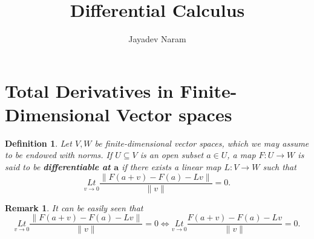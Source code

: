 \documentclass[11pt,a4paper]{article}
\author{Jayadev Naram}
\title{Differential Calculus}
\begin{document}
\date{}
\maketitle
\tableofcontents

\newtheorem{theorem}{Theorem}
\newtheorem*{corollary}{Corollary}
\newtheorem{lemma}[theorem]{Lemma}
\newtheorem{definition}{Definition}
\newtheorem{remark}{Remark}
\newtheorem{example}{Example}
\newtheorem{proposition}{Proposition}

\newcommand{\R}{\mathbb{R}}
\newcommand{\A}{\mathcal{A}}
\newcommand{\M}{\mathcal{M}}
\newcommand{\N}{\mathcal{N}}
\newcommand{\T}{\mathcal{T}}
\newcommand{\B}{\mathcal{B}}
\newcommand{\bb}{\mathbb{B}}
\newcommand{\highlight}[1]{\textsl{\textbf{#1}}}
\newcommand{\mapping}[3]{#1:#2\rightarrow #3}
\newcommand{\doubt}{\highlight{[??]}}
\newcommand{\bigvert}[2]{\left.#1\right|_{#2}}
\newcommand{\sdnn}[1]{${#1}$}
\newcommand{\bsdnn}[1]{$\boldsymbol{#1}$}
\newcommand{\ifthen}[2]{\textbf{(#1)}\boldsymbol{\implies}\textbf{(#2)}}
\newcommand{\bsdn}[1]{\boldsymbol{#1}}
\newcommand{\forward}{$(\implies)$}
\newcommand{\converse}{$(\impliedby)$}
\newcommand{\Lt}[1]{\underset{#1\rightarrow 0}{Lt}}
\newcommand{\norm}[1]{\|#1\|}
\newcommand{\dparder}[2]{\dfrac{\partial #1}{\partial x^{#2}}}
\newcommand{\fparder}[2]{\frac{\partial #1}{\partial x^{#2}}}
\newcommand{\parder}[2]{\partial #1/\partial x^{#2}}
\newcommand{\parop}[1]{\dfrac{\partial}{\partial x^{#1}}}

\section{Total Derivatives in Finite-Dimensional Vector spaces}

\begin{definition}
Let $V,W$ be finite-dimensional vector spaces, which we may assume to be endowed with norms. If $U\subseteq V$ is an open subset $a\in U$, a map $\mapping{F}{U}{W}$ is said to be \highlight{differentiable at \bsdnn{a}} if there exists a linear map $\mapping{L}{V}{W}$ such that 
\begin{equation}\label{eqn:differentiable_at_a}
\Lt{v} \dfrac{\|F(a+v)-F(a)-Lv\|}{\|v\|} = 0.
\end{equation}
\end{definition}

\begin{remark}\label{remark:differentiable_at_a}
It can be easily seen that 
\begin{equation}
\Lt{v} \dfrac{\|F(a+v)-F(a)-Lv\|}{\|v\|} = 0 \Leftrightarrow \Lt{v} \dfrac{F(a+v)-F(a)-Lv}{\|v\|} = 0.
\end{equation}
\end{remark}
\end{document}
